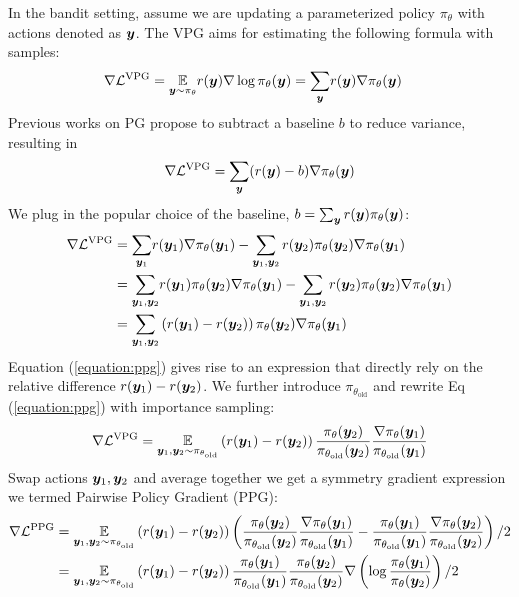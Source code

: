 \documentclass{article} %
\begin{document}
In the bandit setting, assume we are updating a parameterized policy $\pi_\theta$ with actions denoted as ${\bm{y}}$. The VPG aims for estimating the following formula with samples:
\begin{align}\label{equation:plainpg}\nabla\mathcal{L}^{\text{VPG}} &= \underset{{\bm{y}}\sim\pi_{\theta}}{\mathbb{E}}r({\bm{y}})\nabla\log\pi_{\theta}({\bm{y}})=\underset{{\bm{y}}}{\sum}r({\bm{y}})\nabla\pi_{\theta}({\bm{y}})
\end{align}
Previous works on PG propose to subtract a baseline $b$ to reduce variance, resulting in 
$$\nabla\mathcal{L}^{\text{VPG}} = \underset{{\bm{y}}}{\sum}(r({\bm{y}})-b)\nabla\pi_{\theta}({\bm{y}})$$
We plug in the popular choice of the baseline, $b=\sum_{{\bm{y}}} r({\bm{y}})\pi_{\theta}({\bm{y}})$:
\begin{align}
    \nabla\mathcal{L}^{\text{VPG}} &=\underset{{\bm{y}}_1}{\sum}r({\bm{y}}_1) \nabla\pi_{\theta}({\bm{y}}_1)-\sum_{{\bm{y}}_1,{\bm{y}}_2} r({\bm{y}}_2)\pi_{\theta}({\bm{y}}_2) \nabla\pi_{\theta}({\bm{y}}_1)\nonumber\\
    &=\underset{{\bm{y}}_1,{\bm{y}}_2}{\sum}r({\bm{y}}_1)\pi_\theta({\bm{y}}_2) \nabla\pi_{\theta}({\bm{y}}_1)-\sum_{{\bm{y}}_1,{\bm{y}}_2} r({\bm{y}}_2)\pi_{\theta}({\bm{y}}_2) \nabla\pi_{\theta}({\bm{y}}_1)\nonumber\\
    &=\underset{{\bm{y}}_1,{\bm{y}}_2}{\sum}\left(r({\bm{y}}_1)-r({\bm{y}}_2)\right)\pi_\theta({\bm{y}}_2) \nabla\pi_{\theta}({\bm{y}}_1) \label{equation:ppg}
\end{align}
Equation (\ref{equation:ppg}) gives rise to an expression that directly rely on the relative difference $r({\bm{y}}_1)-r({\bm{y}}_2)$. 
We further introduce $\pi_{\theta_{\text{old}}}$ and rewrite Eq (\ref{equation:ppg}) with importance sampling:
\begin{align*}
    \nabla\mathcal{L}^{\text{VPG}} = \underset{{\bm{y}}_1,{\bm{y}}_2\sim\pi_{\theta_{\text{old}}}}{\mathbb{E}}\left(r({\bm{y}}_1)-r({\bm{y}}_2)\right)\frac{\pi_\theta({\bm{y}}_2)}{\pi_{\theta_{\text{old}}}({\bm{y}}_2)} \frac{\nabla\pi_{\theta}({\bm{y}}_1)}{\pi_{\theta_{\text{old}}}({\bm{y}}_1)}
\end{align*}
Swap actions ${\bm{y}}_1, {\bm{y}}_2$ and average together we get a symmetry gradient expression we termed Pairwise Policy Gradient (PPG):
{\begin{align}
\nabla \mathcal{L}^{\text{PPG}} &=\underset{{\bm{y}}_1,{\bm{y}}_2\sim\pi_{\theta_{\text{old}}}}{\mathbb{E}}\left(r({\bm{y}}_1)-r({\bm{y}}_2)\right)\left(\frac{\pi_\theta({\bm{y}}_2)}{\pi_{\theta_{\text{old}}}({\bm{y}}_2)}\frac{\nabla\pi_\theta({\bm{y}}_1)}{\pi_{\theta_{\text{old}}}({\bm{y}}_1)}-\frac{\pi_\theta({\bm{y}}_1)}{\pi_{\theta_{\text{old}}}({\bm{y}}_1)}\frac{\nabla\pi_\theta({\bm{y}}_2)}{\pi_{\theta_{\text{old}}}({\bm{y}}_2)}\right)/2\\
&=\underset{{\bm{y}}_1,{\bm{y}}_2\sim\pi_{\theta_{\text{old}}}}{\mathbb{E}}
\left(r({\bm{y}}_1)-r({\bm{y}}_2)\right)\frac{\pi_\theta({\bm{y}}_1)}{\pi_{\theta_{\text{old}}}({\bm{y}}_1)}\frac{\pi_\theta({\bm{y}}_2)}{\pi_{\theta_{\text{old}}}({\bm{y}}_2)}\nabla\left(\log\frac{\pi_\theta({\bm{y}}_1)}{\pi_\theta({\bm{y}}_2)}\right)/2
\end{align}}
\end{document}
